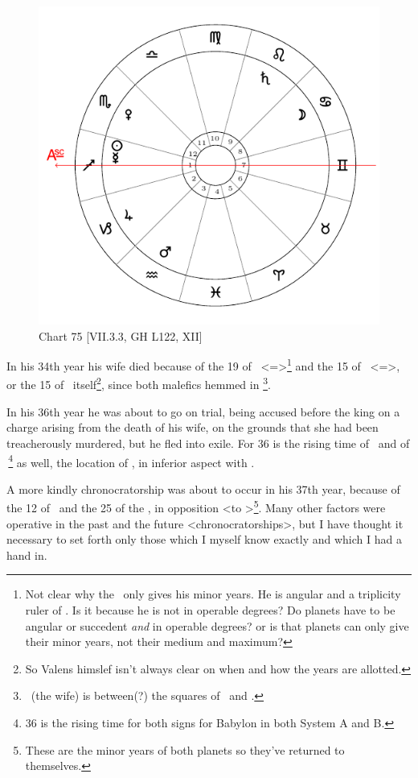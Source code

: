 \begin{figure}
\centering
\vspace{-20pt}
\includegraphics[width=.68\textwidth]{charts/7_3_3}
\caption{Chart 75 [VII.3.3, GH L122, XII]}
\label{fig:chart75}
\end{figure}


In his 34th year his wife died because of the 19 of \Leo\, <=\Sun>\footnote{Not clear why the \Sun\, only gives his minor years. He is angular and a triplicity ruler of \Sagittarius. Is it because he is not in operable degrees? Do planets have to be angular or succedent \textsl{and} in operable degrees? or is that planets can only give their minor years, not their medium and maximum?} and the 15 of \Scorpio\, <=\Mars>, or the 15 of \Mars\, itself\footnote{So Valens himslef isn't always clear on when and how the years are allotted.}, since both malefics hemmed in \Venus\footnote{\Venus\, (the wife) is between(?) the squares of \Mars\, and \Saturn.}. 

In his 36th year he was about to go on trial, being accused before the king on a charge arising from the death of his wife, on the grounds that she had been treacherously murdered, but he fled into exile. For
36 is the rising time of \Leo\, and of \Scorpio\,\footnote{36 is the rising time for both signs for Babylon in  both System A and B.} as well, the location of \Venus, in inferior aspect with \Saturn. 

A more kindly chronocratorship was about to occur in his 37th year, because of the 12 of \Jupiter\, and the 25 of the \Moon, in opposition <to \Jupiter>\footnote{These are the minor years of both planets so they've returned to themselves.}. Many other factors were operative in the past and the future <chronocratorships>, but I have thought it necessary to set forth only those which I myself know exactly
and which I had a hand in.

